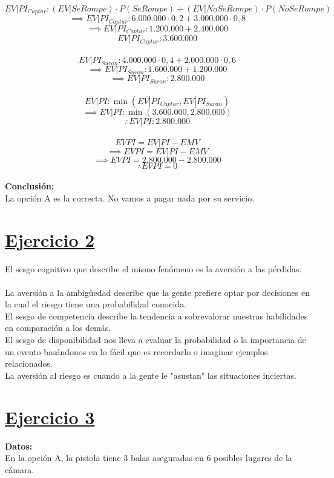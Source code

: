 \documentclass{article}
\newcommand{\ulcolor}[2][Red]{\setulcolor{#1}\ul{#2}}
\begin{document}
        \[EV|PI_{Captur}: (EV|Se Rompe) \cdot P(Se Rompe) + (EV|No Se Rompe) \cdot P(No Se Rompe)\]
        \[\implies EV|PI_{Captur}: 6.000.000 \cdot 0,2 + 3.000.000 \cdot 0,8\]
        \[\implies EV|PI_{Captur}: 1.200.000 + 2.400.000\]
        \[EV|PI_{Captur}: 3.600.000\]
        \\
        \[EV|PI_{Suran}: 4.000.000 \cdot 0,4 + 2.000.000 \cdot 0,6\]
        \[\implies EV|PI_{Suran}: 1.600.000 + 1.200.000\]
        \[\implies EV|PI_{Suran}: 2.800.000\]
        \\
        \[EV|PI: \min(EV|PI_{Captur}, EV|PI_{Suran})\]
        \[\implies EV|PI: \min(3.600.000, 2.800.000) \]
        \[\therefore EV|PI: 2.800.000 \]
        \\
        \[EVPI = EV|PI - EMV\]
        \[\implies EVPI = EV|PI - EMV\]
        \[\implies EVPI = 2.800.000 - 2.800.000\]
        \[\therefore EVPI = 0\]
        \\
        \textbf{Conclusión:} \\
        La opción A es la correcta. No vamos a pagar nada por su servicio.
    \section*{\ulcolor[Green]{Ejercicio 2}}
        El sesgo cognitivo que describe el mismo fenómeno es la aversión a las pérdidas. \\
        \\
        La aversión a la ambigüedad describe que la gente prefiere optar por decisiones en la cual el riesgo tiene una probabilidad conocida. \\
        El sesgo de competencia describe la tendencia a sobrevalorar nuestras habilidades en comparación a los demás. \\
        El sesgo de disponibilidad nos lleva a evaluar la probabilidad o la importancia de un evento basándonos en lo fácil que es recordarlo o imaginar ejemplos relacionados.\\
        La aversión al riesgo es cuando a la gente le "asustan" las situaciones inciertas.
    \section*{\ulcolor[Yellow]{Ejercicio 3}}
        \textbf{Datos:} \\
        En la opción A, la pistola tiene 3 balas aseguradas en 6 posibles lugares de la cámara. \\
\end{document}
